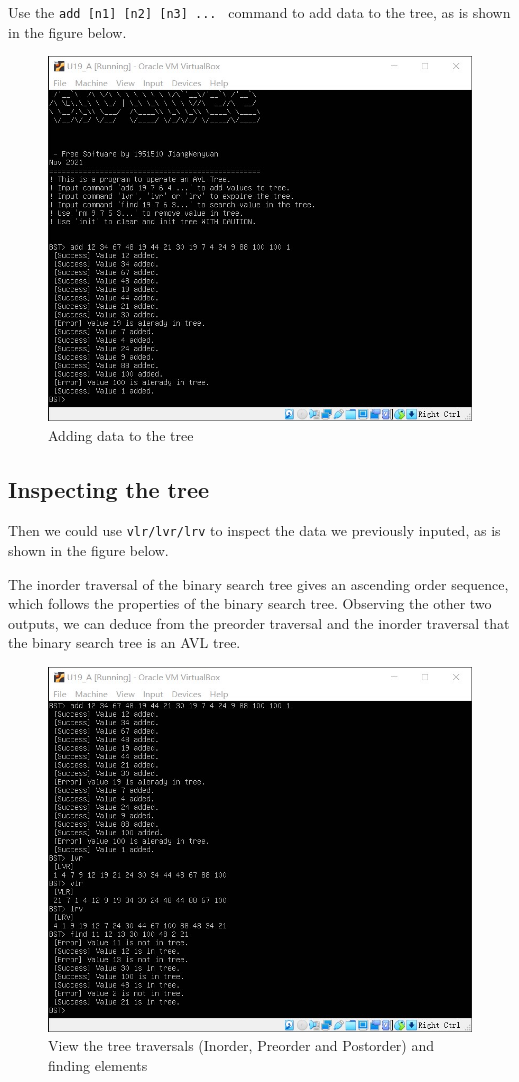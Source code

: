 \documentclass[cn,black,12pt,normal]{elegantnote}
\begin{document}
Use the \lstinline{add [n1] [n2] [n3] ... } command to add data to the tree, as is shown in the figure below.
\begin{figure}[H]
    \centering
    \includegraphics[width=0.7\linewidth]{image/avl_02.jpg}
    \caption{Adding data to the tree}
\end{figure}

\subsection{Inspecting the tree}
Then we could use \lstinline{vlr/lvr/lrv} to inspect the data we previously inputed, as is shown in the figure below.

The inorder traversal of the binary search tree gives an ascending order sequence, which follows the properties of the binary search tree. Observing the other two outputs, we can deduce from the preorder traversal and the inorder traversal that the binary search tree is an AVL tree.
\begin{figure}[H]
    \centering
    \includegraphics[width=0.7\linewidth]{image/avl_04.jpg}
    \caption{View the tree traversals (Inorder, Preorder and Postorder) and finding elements}
\end{figure}
\end{document}
